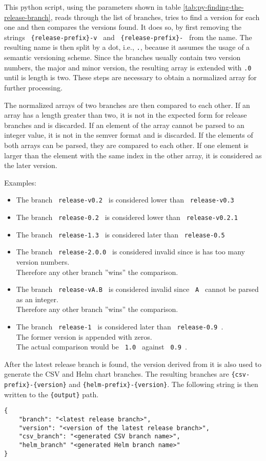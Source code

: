 This python script, using the parameters shown in table \ref{tab:py-finding-the-release-branch}, reads through the list of branches, tries to find a version for each one and then compares the versions found.
It does so, by first removing the strings \verb| {release-prefix}-v | and \verb| {release-prefix}- | from the name.
The resulting name is then split by a dot, i.e., \verb|.|, because it assumes the usage of a semantic versioning scheme.
Since the branches usually contain two version numbers, the major and minor version, the resulting array is extended with \verb|.0| until is length is two.
These steps are necessary to obtain a normalized array for further processing.

The normalized arrays of two branches are then compared to each other.
If an array has a length greater than two, it is not in the expected form for release branches and is discarded.
If an element of the array cannot be parsed to an integer value, it is not in the semver format and is discarded.
If the elements of both arrays can be parsed, they are compared to each other.
If one element is larger than the element with the same index in the other array, it is considered as the later version.

Examples:
\begin{itemize}
    \item The branch \verb| release-v0.2 | is considered lower than \verb| release-v0.3 |
    \item The branch \verb| release-0.2 |  is considered lower than \verb| release-v0.2.1 |
    \item The branch \verb| release-1.3 | is considered later than \verb| release-0.5 |
    \item The branch \verb| release-2.0.0 | is considered invalid since is has too many version numbers. \\ Therefore any other branch ''wins'' the comparison.
    \item The branch \verb| release-vA.B | is considered invalid since \verb| A | cannot be parsed as an integer. \\ Therefore any other branch ''wins'' the comparison.
    \item The branch \verb| release-1 | is considered later than \verb| release-0.9 |. \\ The former version is appended with zeros. \\ The actual comparison would be \verb| 1.0 | against \verb| 0.9 |.
\end{itemize}

After the latest release branch is found, the version derived from it is also used to generate the CSV and Helm chart branches.
The resulting branches are \verb`{csv-prefix}-{version}` and \verb`{helm-prefix}-{version}`.
The following string is then written to the \verb`{output}` path.

\begin{verbatim}
{
    "branch": "<latest release branch>",
    "version": "<version of the latest release branch>",
    "csv_branch": "<generated CSV branch name>",
    "helm_branch" "<generated Helm branch name>"
}
\end{verbatim}

